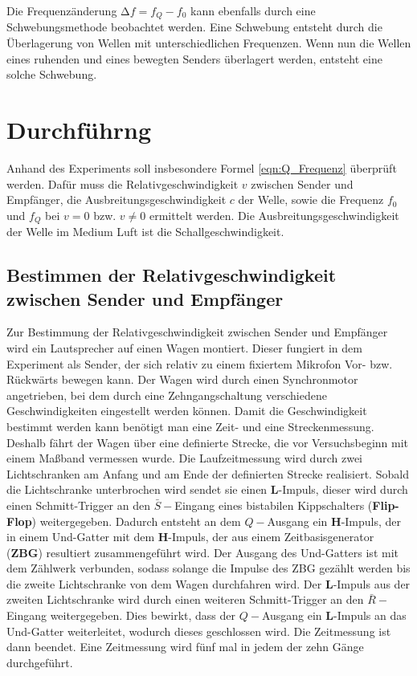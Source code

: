 \documentclass[parskip=half]{scrartcl}
\begin{document}
Die Frequenzänderung $\increment f = f_Q - f_0$ kann ebenfalls durch eine Schwebungsmethode beobachtet werden. Eine Schwebung entsteht durch die Überlagerung von Wellen mit unterschiedlichen Frequenzen. Wenn nun die Wellen eines ruhenden und eines bewegten Senders überlagert werden, entsteht eine solche Schwebung.
\section{Durchführng}
Anhand des Experiments soll insbesondere Formel \eqref{eqn:Q_Frequenz} überprüft werden. Dafür muss die Relativgeschwindigkeit $v$ zwischen Sender und Empfänger, die Ausbreitungsgeschwindigkeit $c$ der Welle, sowie die Frequenz $f_0$ und $f_Q$ bei $v = 0$ bzw. $v \neq 0$ ermittelt werden. Die Ausbreitungsgeschwindigkeit der Welle im Medium Luft ist die Schallgeschwindigkeit.
\subsection{Bestimmen der Relativgeschwindigkeit zwischen Sender und Empfänger}
Zur Bestimmung der Relativgeschwindigkeit zwischen Sender und Empfänger wird ein Lautsprecher auf einen Wagen montiert. Dieser fungiert in dem Experiment als Sender, der sich relativ zu einem fixiertem Mikrofon Vor- bzw. Rückwärts bewegen kann. Der Wagen wird durch einen Synchronmotor angetrieben, bei dem durch eine Zehngangschaltung verschiedene Geschwindigkeiten eingestellt werden können. Damit die Geschwindigkeit bestimmt werden kann benötigt man eine Zeit- und eine Streckenmessung. Deshalb fährt der Wagen über eine definierte Strecke, die vor Versuchsbeginn mit einem Maßband vermessen wurde. Die Laufzeitmessung wird durch zwei Lichtschranken am Anfang und am Ende der definierten Strecke realisiert. Sobald die Lichtschranke unterbrochen wird sendet sie einen \textbf{L}-Impuls, dieser wird durch einen Schmitt-Trigger an den $\bar{S}-$Eingang eines bistabilen Kippschalters (\textbf{Flip-Flop}) weitergegeben. Dadurch entsteht an dem $Q-$Ausgang ein \textbf{H}-Impuls, der in einem Und-Gatter mit dem \textbf{H}-Impuls, der aus einem Zeitbasisgenerator (\textbf{ZBG}) resultiert zusammengeführt wird. Der Ausgang des Und-Gatters ist mit dem Zählwerk verbunden, sodass solange die Impulse des ZBG gezählt werden bis die zweite Lichtschranke von dem Wagen durchfahren wird. Der \textbf{L}-Impuls aus der zweiten Lichtschranke wird durch einen weiteren Schmitt-Trigger an den $\bar{R}-$Eingang weitergegeben. Dies bewirkt, dass der $Q-$Ausgang ein \textbf{L}-Impuls an das Und-Gatter weiterleitet, wodurch dieses geschlossen wird. Die Zeitmessung ist dann beendet.
Eine Zeitmessung wird fünf mal in jedem der zehn Gänge durchgeführt.
\end{document}
